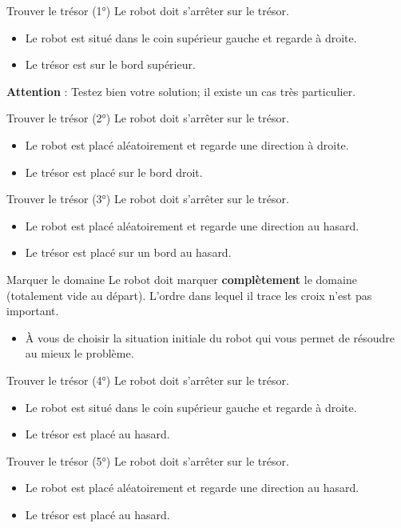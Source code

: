 		\begin{Exercice}{Trouver le trésor (1°)}
			Le robot doit s'arrêter sur le trésor.

			\begin{itemize}
			\item Le robot est situé dans le coin supérieur gauche et regarde à droite.
			\item Le trésor est sur le bord supérieur.
			\end{itemize}

			\textbf{Attention} : 
			Testez bien votre solution; il existe un cas très particulier.
		\end{Exercice}

		\begin{Exercice}{Trouver le trésor (2°)}
			Le robot doit s'arrêter sur le trésor.

			\begin{itemize}
			\item Le robot est placé aléatoirement et regarde une direction à droite.
			\item Le trésor est placé sur le bord droit.
			\end{itemize}
		\end{Exercice}

		\begin{Exercice}{Trouver le trésor (3°)}
			Le robot doit s'arrêter sur le trésor.

			\begin{itemize}
			\item Le robot est placé aléatoirement et regarde une direction au hasard.
			\item Le trésor est placé sur un bord au hasard.
			\end{itemize}
		\end{Exercice}

		\begin{Exercice}{Marquer le domaine}
			Le robot doit marquer \textbf{complètement} le domaine
			(totalement vide au départ). 
			L'ordre dans lequel il trace les croix n'est pas important.

			\begin{itemize}
			\item
				À vous de choisir la situation initiale du robot qui vous permet de
				résoudre au mieux le problème.
			\end{itemize}
		\end{Exercice}

		\begin{Exercice}{Trouver le trésor (4°)}
			Le robot doit s'arrêter sur le trésor.

			\begin{itemize}
			\item Le robot est situé dans le coin supérieur gauche et regarde à droite.
			\item Le trésor est placé au hasard.
			\end{itemize}
		\end{Exercice}

		\begin{Exercice}{Trouver le trésor (5°)}
			Le robot doit s'arrêter sur le trésor.

			\begin{itemize}
			\item Le robot est placé aléatoirement et regarde une direction au hasard.
			\item Le trésor est placé au hasard.
			\end{itemize}
		\end{Exercice}
			
